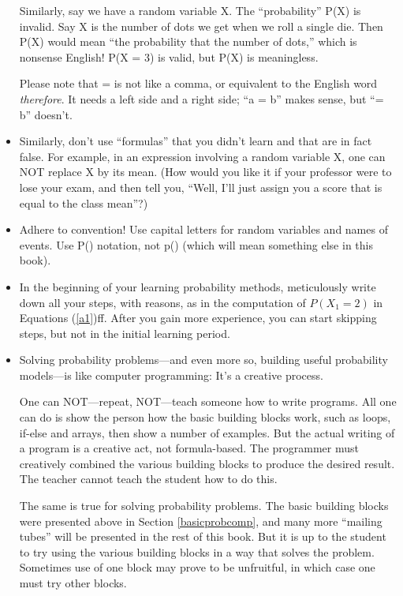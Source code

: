 \begin{itemize}
Similarly, say we have a random variable X.  The ``probability'' P(X) is
invalid.  Say X is the number of dots we get when we roll a single die.
Then P(X) would mean ``the probability that the number of dots,'' which
is nonsense English!  P(X = 3) is valid, but P(X) is meaningless. 

Please note that = is not like a comma, or equivalent to the English
word {\it therefore}.  It needs a left side and a right side; ``a = b''
makes sense, but ``= b'' doesn't.

\item Similarly, don't use ``formulas'' that you didn't learn and that
are in fact false.  For example, in an expression involving a random
variable X, one can NOT replace X by its mean.  (How would you like it
if your professor were to lose your exam, and then tell you, ``Well,
I'll just assign you a score that is equal to the class mean''?)

\item Adhere to convention!  Use capital letters for random variables
and names of events.  Use P() notation, not p() (which will mean
something else in this book).

\item In the beginning of your learning probability methods,
meticulously write down all your steps, with reasons, as in the
computation of $P(X_1 = 2)$ in Equations (\ref{a1})ff.  After you gain
more experience, you can start skipping steps, but not in the initial
learning period.

\item Solving probability problems---and even more so, building useful
probability models---is like computer programming:  It's a creative
process.

One can NOT---repeat, NOT---teach someone how to write programs.  All
one can do is show the person how the basic building blocks work, such
as loops, if-else and arrays, then show a number of examples.  But the
actual writing of a program is a creative act, not formula-based.  The
programmer must creatively combined the various building blocks to
produce the desired result.  The teacher cannot teach the student how to
do this.

The same is true for solving probability problems.  The basic building
blocks were presented above in Section \ref{basicprobcomp}, and many
more ``mailing tubes'' will be presented in the rest of this book.  But
it is up to the student to try using the various building blocks in a
way that solves the problem.  Sometimes use of one block may prove to be
unfruitful, in which case one must try other blocks.


\end{itemize}
